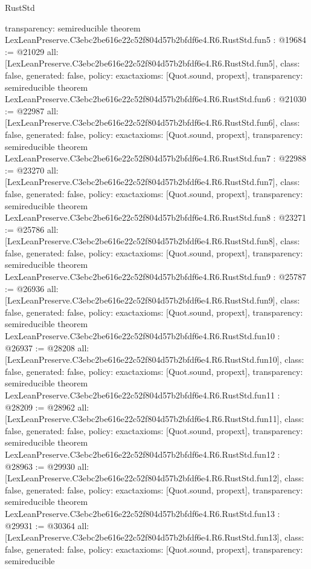 \begin{lexlean}{RustStd}
\begin{coremodule}
{  transparency: semireducible
}
theorem LexLeanPreserve.C3ebc2be616e22c52f804d57b2bfdf6e4.R6.RustStd.fun5 : @19684 := @21029 {
  all: [LexLeanPreserve.C3ebc2be616e22c52f804d57b2bfdf6e4.R6.RustStd.fun5],
  class: false,
  generated: false,
  policy: exact{axioms: [Quot.sound, propext]},
  transparency: semireducible
}
theorem LexLeanPreserve.C3ebc2be616e22c52f804d57b2bfdf6e4.R6.RustStd.fun6 : @21030 := @22987 {
  all: [LexLeanPreserve.C3ebc2be616e22c52f804d57b2bfdf6e4.R6.RustStd.fun6],
  class: false,
  generated: false,
  policy: exact{axioms: [Quot.sound, propext]},
  transparency: semireducible
}
theorem LexLeanPreserve.C3ebc2be616e22c52f804d57b2bfdf6e4.R6.RustStd.fun7 : @22988 := @23270 {
  all: [LexLeanPreserve.C3ebc2be616e22c52f804d57b2bfdf6e4.R6.RustStd.fun7],
  class: false,
  generated: false,
  policy: exact{axioms: [Quot.sound, propext]},
  transparency: semireducible
}
theorem LexLeanPreserve.C3ebc2be616e22c52f804d57b2bfdf6e4.R6.RustStd.fun8 : @23271 := @25786 {
  all: [LexLeanPreserve.C3ebc2be616e22c52f804d57b2bfdf6e4.R6.RustStd.fun8],
  class: false,
  generated: false,
  policy: exact{axioms: [Quot.sound, propext]},
  transparency: semireducible
}
theorem LexLeanPreserve.C3ebc2be616e22c52f804d57b2bfdf6e4.R6.RustStd.fun9 : @25787 := @26936 {
  all: [LexLeanPreserve.C3ebc2be616e22c52f804d57b2bfdf6e4.R6.RustStd.fun9],
  class: false,
  generated: false,
  policy: exact{axioms: [Quot.sound, propext]},
  transparency: semireducible
}
theorem LexLeanPreserve.C3ebc2be616e22c52f804d57b2bfdf6e4.R6.RustStd.fun10 : @26937 := @28208 {
  all: [LexLeanPreserve.C3ebc2be616e22c52f804d57b2bfdf6e4.R6.RustStd.fun10],
  class: false,
  generated: false,
  policy: exact{axioms: [Quot.sound, propext]},
  transparency: semireducible
}
theorem LexLeanPreserve.C3ebc2be616e22c52f804d57b2bfdf6e4.R6.RustStd.fun11 : @28209 := @28962 {
  all: [LexLeanPreserve.C3ebc2be616e22c52f804d57b2bfdf6e4.R6.RustStd.fun11],
  class: false,
  generated: false,
  policy: exact{axioms: [Quot.sound, propext]},
  transparency: semireducible
}
theorem LexLeanPreserve.C3ebc2be616e22c52f804d57b2bfdf6e4.R6.RustStd.fun12 : @28963 := @29930 {
  all: [LexLeanPreserve.C3ebc2be616e22c52f804d57b2bfdf6e4.R6.RustStd.fun12],
  class: false,
  generated: false,
  policy: exact{axioms: [Quot.sound, propext]},
  transparency: semireducible
}
theorem LexLeanPreserve.C3ebc2be616e22c52f804d57b2bfdf6e4.R6.RustStd.fun13 : @29931 := @30364 {
  all: [LexLeanPreserve.C3ebc2be616e22c52f804d57b2bfdf6e4.R6.RustStd.fun13],
  class: false,
  generated: false,
  policy: exact{axioms: [Quot.sound, propext]},
  transparency: semireducible
}
\end{coremodule}
\end{lexlean}
